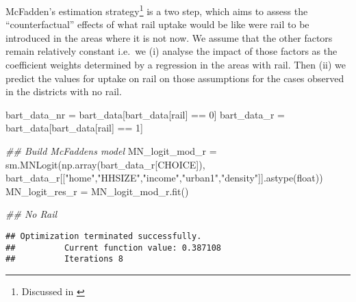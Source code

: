 \documentclass[]{tufte-book}
\newenvironment{Shaded}{}{}
\newcommand{\BuiltInTok}[1]{#1}
\newcommand{\CommentTok}[1]{\textcolor[rgb]{0.38,0.63,0.69}{\textit{#1}}}
\newcommand{\DecValTok}[1]{\textcolor[rgb]{0.25,0.63,0.44}{#1}}
\newcommand{\NormalTok}[1]{#1}
\newcommand{\OperatorTok}[1]{\textcolor[rgb]{0.40,0.40,0.40}{#1}}
\newcommand{\StringTok}[1]{\textcolor[rgb]{0.25,0.44,0.63}{#1}}
\theoremstyle{definition}
\theoremstyle{definition}
\theoremstyle{definition}
\theoremstyle{remark}
\begin{document}
McFadden's estimation strategy\footnote{Discussed in \citet{MicroeconR}} is a two step, which aims to assess the ``counterfactual'' effects of what rail uptake would be like were rail to be introduced in the areas where it is not now. We assume that the other factors remain relatively constant i.e.~we (i) analyse the impact of those factors as the coefficient weights determined by a regression in the areas with rail. Then (ii) we predict the values for uptake on rail on those assumptions for the cases observed in the districts with no rail.

\begin{Shaded}
\begin{Highlighting}[]
\NormalTok{bart\_data\_nr }\OperatorTok{=}\NormalTok{ bart\_data[bart\_data[}\StringTok{\textquotesingle{}rail\textquotesingle{}}\NormalTok{] }\OperatorTok{==} \DecValTok{0}\NormalTok{]}
\NormalTok{bart\_data\_r }\OperatorTok{=}\NormalTok{ bart\_data[bart\_data[}\StringTok{\textquotesingle{}rail\textquotesingle{}}\NormalTok{] }\OperatorTok{==} \DecValTok{1}\NormalTok{]}

\CommentTok{\#\# Build McFadden\textquotesingle{}s model}
\NormalTok{MN\_logit\_mod\_r }\OperatorTok{=}\NormalTok{ sm.MNLogit(np.array(bart\_data\_r[}\StringTok{\textquotesingle{}CHOICE\textquotesingle{}}\NormalTok{]), }
\NormalTok{                       bart\_data\_r[[}\StringTok{"home"}\NormalTok{,}\StringTok{"HHSIZE"}\NormalTok{,}\StringTok{"income"}\NormalTok{,}\StringTok{"urban1"}\NormalTok{,}\StringTok{"density"}\NormalTok{]].astype(}\BuiltInTok{float}\NormalTok{))}
\NormalTok{MN\_logit\_res\_r }\OperatorTok{=}\NormalTok{ MN\_logit\_mod\_r.fit()}


\CommentTok{\#\# No Rail}
\end{Highlighting}
\end{Shaded}

\begin{verbatim}
## Optimization terminated successfully.
##          Current function value: 0.387108
##          Iterations 8
\end{verbatim}
\end{document}
